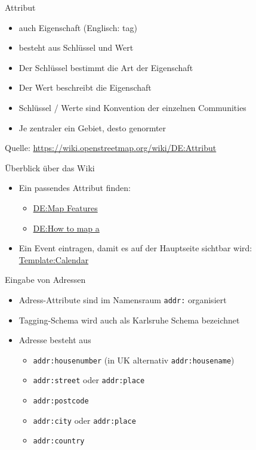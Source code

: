 \documentclass{beamer}
\begin{document}
\begin{frame}{Attribut}
\begin{itemize}
  \item auch Eigenschaft (Englisch: tag)
  \item besteht aus Schlüssel und Wert
  \item Der Schlüssel bestimmt die Art der Eigenschaft
  \item Der Wert beschreibt die Eigenschaft
  \item Schlüssel / Werte sind Konvention der einzelnen Communities
  \item Je zentraler ein Gebiet, desto genormter
\end{itemize}
Quelle: \url{https://wiki.openstreetmap.org/wiki/DE:Attribut}
\end{frame}

\begin{frame}{Überblick über das Wiki}
\begin{itemize}
  \item Ein passendes Attribut finden:
  \begin{itemize}
    \item \href{https://wiki.openstreetmap.org/wiki/DE:Map_Features}{DE:Map Features}
    \item \href{https://wiki.openstreetmap.org/wiki/DE:How_to_map_a}{DE:How to map a}
  \end{itemize}
  \item Ein Event eintragen, damit es auf der Hauptseite sichtbar wird: \href{https://wiki.openstreetmap.org/wiki/Template:Calendar}{Template:Calendar}
\end{itemize}
\end{frame}

\begin{frame}{Eingabe von Adressen}
\begin{itemize}
  \item Adress-Attribute sind im Namensraum \texttt{addr:} organisiert
  \item Tagging-Schema wird auch als Karlsruhe Schema bezeichnet
  \item Adresse besteht aus
  \begin{itemize}
    \item \texttt{addr:housenumber} (in UK alternativ \texttt{addr:housename})
    \item \texttt{addr:street} oder \texttt{addr:place}
    \item \texttt{addr:postcode}
    \item \texttt{addr:city} oder \texttt{addr:place}
    \item \texttt{addr:country}
  \end{itemize}
\end{itemize}
\end{frame}
\end{document}
